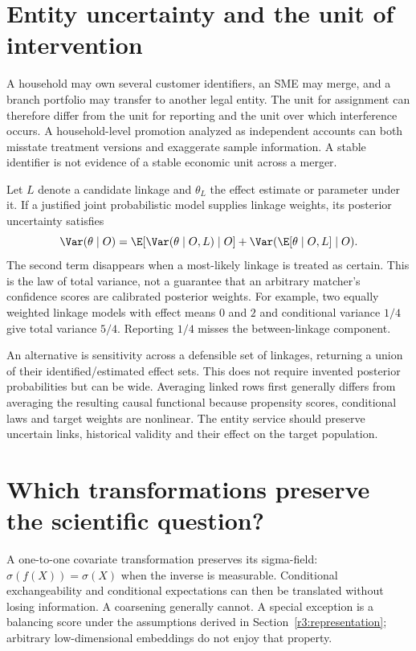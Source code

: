 \section{Entity uncertainty and the unit of intervention}
\label{r3:entity-uncertainty}
A household may own several customer identifiers, an SME may merge,
and a branch portfolio may transfer to another legal entity. The unit
for assignment can therefore differ from the unit for reporting and
the unit over which interference occurs. A household-level promotion
analyzed as independent accounts can both misstate treatment versions
and exaggerate sample information. A stable identifier is not evidence
of a stable economic unit across a merger.

Let $L$ denote a candidate linkage and $\theta_L$ the effect estimate
or parameter under it. If a justified joint probabilistic model supplies
linkage weights, its posterior uncertainty satisfies
\begin{equation}
 \Var(\theta\mid O)=
 \E[\Var(\theta\mid O,L)\mid O]
 +\Var(\E[\theta\mid O,L]\mid O).
 \label{r3:linkage-variance}
\end{equation}
The second term disappears when a most-likely linkage is treated as
certain. This is the law of total variance, not a guarantee that an
arbitrary matcher's confidence scores are calibrated posterior weights.
For example, two equally weighted linkage models with effect means
$0$ and $2$ and conditional variance $1/4$ give total variance $5/4$.
Reporting $1/4$ misses the between-linkage component.

An alternative is sensitivity across a defensible set of linkages,
returning a union of their identified/estimated effect sets. This does
not require invented posterior probabilities but can be wide. Averaging
linked rows first generally differs from averaging the resulting causal
functional because propensity scores, conditional laws and target
weights are nonlinear. The entity service should preserve uncertain
links, historical validity and their effect on the target population.

\section{Which transformations preserve the scientific question?}
\label{r3:data-transformations}
A one-to-one covariate transformation preserves its sigma-field:
$\sigma(f(X))=\sigma(X)$ when the inverse is measurable. Conditional
exchangeability and conditional expectations can then be translated
without losing information. A coarsening generally cannot. A special
exception is a balancing score under the assumptions derived in
Section~\ref{r3:representation}; arbitrary low-dimensional embeddings
do not enjoy that property.

